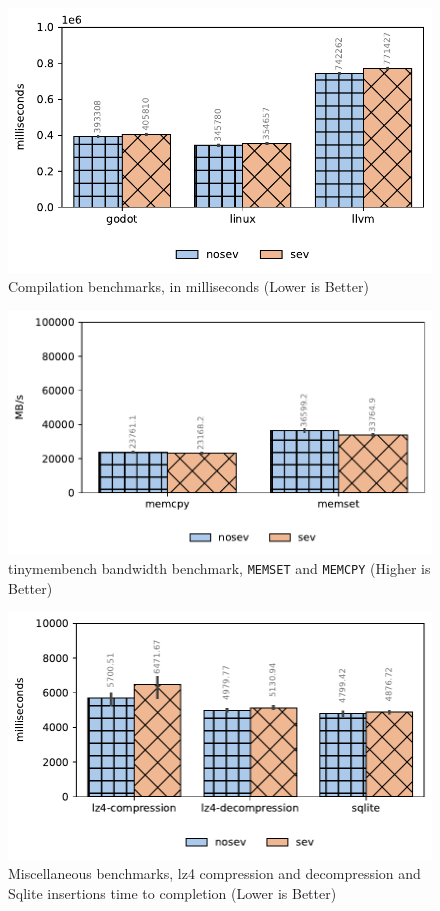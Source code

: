 \documentclass[twocolumn]{article}
\begin{document}
\begin{figure}[ht]
    \centering
    \includegraphics[width=\columnwidth]{img/compilation-benchmark.pdf}
    \caption{Compilation benchmarks, in milliseconds (Lower is Better)}
    \label{fig:tb-compilation}
\end{figure}

\begin{figure}[ht]
    \centering
    \includegraphics[width=\columnwidth]{img/tinymembenchmark.pdf}
    \caption{tinymembench bandwidth benchmark, \texttt{MEMSET} and \texttt{MEMCPY} (Higher is Better)}
    \label{fig:tb-tinymembench}
\end{figure}

\begin{figure}[ht]
    \centering
    \includegraphics[width=\columnwidth]{img/misc.pdf}
    \caption{Miscellaneous benchmarks, lz4 compression and decompression and Sqlite insertions time to completion (Lower is Better)}
    \label{fig:tb-misc}
\end{figure}
\end{document}
